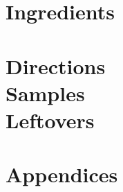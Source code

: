 \documentclass[10pt]{report}
\begin{document}




\part{Ingredients}
\label{part:ing}









\part[Directions, samples and leftovers]{Directions \\ Samples \\ Leftovers}
\label{part:dir}











\printbibliography

\appendix

\part{Appendices}


\end{document}
